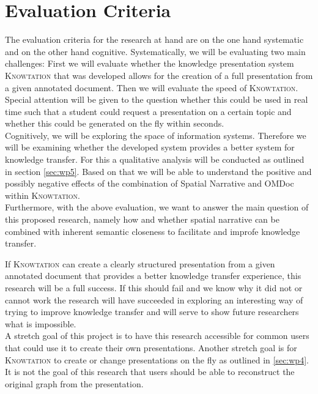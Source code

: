 \documentclass[twoside]{article}
\newcommand{\sys}{\textsc{Knowtation}\xspace}
\begin{document}
\section{Evaluation Criteria}
\label{sec:evalcriteria}

The evaluation criteria for the research at hand are on the one hand systematic and on the other hand cognitive. Systematically, we will be evaluating two main challenges: First we will evaluate whether the knowledge presentation system \sys that was developed allows for the creation of a full presentation from a given annotated document. Then we will evaluate the speed of \sys. Special attention will be given to the question whether this could be used in real time such that a student could request a presentation on a certain topic and whether this could be generated on the fly within seconds.\\

Cognitively, we will be exploring the space of information systems. Therefore we will be examining whether the developed system provides a better system for knowledge transfer. For this a qualitative analysis will be conducted as outlined in section \ref{sec:wp5}. Based on that we will be able to understand the positive and possibly negative effects of the combination of Spatial Narrative and OMDoc within \sys .\\

Furthermore, with the above evaluation, we want to answer the main question of this proposed research, namely how and whether spatial narrative can be combined with inherent semantic closeness to facilitate and improfe knowledge transfer.

If \sys can create a clearly structured presentation from a given annotated document that provides a better knowledge transfer experience, this research will be a full success. If this should fail and we know why it did not or cannot work the research will have succeeded in exploring an interesting way of trying to improve knowledge transfer and will serve to show future researchers what is impossible.\\

A stretch goal of this project is to have this research accessible for common users that could use it to create their own presentations. Another stretch goal is for \sys to create or change presentations on the fly as outlined in \ref{sec:wp4}. It is not the goal of this research that users should be able to reconstruct the original graph from the presentation.\\
\end{document}
